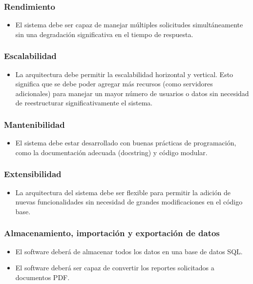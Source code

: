 \documentclass{report}
\begin{document}
            \subsubsection*{Rendimiento}
            \begin{itemize}
                \item El sistema debe ser capaz de manejar múltiples solicitudes simultáneamente sin una degradación 
                significativa en el tiempo de respuesta.
            \end{itemize}
        
            \subsubsection*{Escalabilidad}
            \begin{itemize}
                \item La arquitectura debe permitir la escalabilidad horizontal y vertical. Esto significa que se 
                debe poder agregar más recursos (como servidores adicionales) para manejar un mayor número de 
                usuarios o datos sin necesidad de reestructurar significativamente el sistema.
            \end{itemize}
        
            \subsubsection*{Mantenibilidad}
            \begin{itemize}
                \item El sistema debe estar desarrollado con buenas prácticas de programación, como la documentación 
                adecuada (docstring) y código modular.
            \end{itemize}
        
            \subsubsection*{Extensibilidad}
            \begin{itemize}
                \item La arquitectura del sistema debe ser flexible para permitir la adición de nuevas funcionalidades 
                sin necesidad de grandes modificaciones en el código base.
            \end{itemize}
        
            \subsubsection*{Almacenamiento, importación y exportación de datos}
            \begin{itemize}
                \item El software deberá de almacenar todos los datos en una base de datos SQL.
                \item El software deberá ser capaz de convertir los reportes solicitados a documentos PDF.
            \end{itemize}
\end{document}
